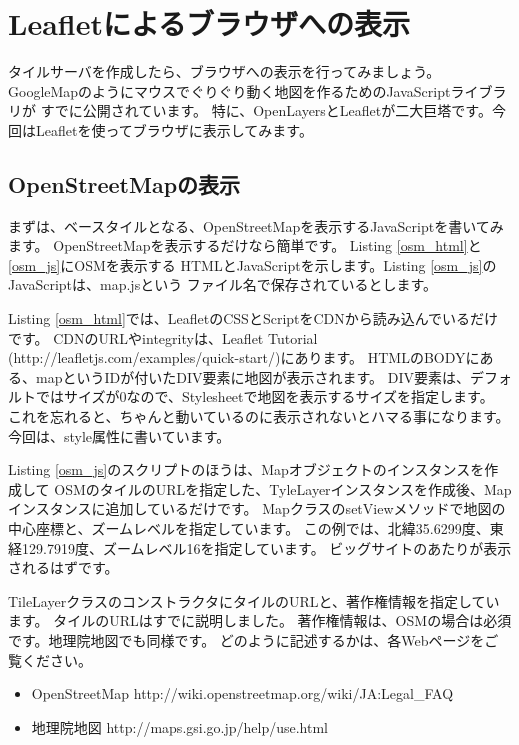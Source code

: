 \chapter*{Leafletによるブラウザへの表示}

タイルサーバを作成したら、ブラウザへの表示を行ってみましょう。
GoogleMapのようにマウスでぐりぐり動く地図を作るためのJavaScriptライブラリが
すでに公開されています。
特に、OpenLayersとLeafletが二大巨塔です。今回はLeafletを使ってブラウザに表示してみます。

\section*{OpenStreetMapの表示}

まずは、ベースタイルとなる、OpenStreetMapを表示するJavaScriptを書いてみます。
OpenStreetMapを表示するだけなら簡単です。
Listing \ref{osm_html}と\ref{osm_js}にOSMを表示する
HTMLとJavaScriptを示します。Listing \ref{osm_js}のJavaScriptは、map.jsという
ファイル名で保存されているとします。

Listing \ref{osm_html}では、LeafletのCSSとScriptをCDNから読み込んでいるだけです。
CDNのURLやintegrityは、Leaflet Tutorial (http://leafletjs.com/examples/quick-start/)にあります。
HTMLのBODYにある、mapというIDが付いたDIV要素に地図が表示されます。
DIV要素は、デフォルトではサイズが0なので、Stylesheetで地図を表示するサイズを指定します。
これを忘れると、ちゃんと動いているのに表示されないとハマる事になります。
今回は、style属性に書いています。



Listing \ref{osm_js}のスクリプトのほうは、Mapオブジェクトのインスタンスを作成して
OSMのタイルのURLを指定した、TyleLayerインスタンスを作成後、Mapインスタンスに追加しているだけです。
MapクラスのsetViewメソッドで地図の中心座標と、ズームレベルを指定しています。
この例では、北緯35.6299度、東経129.7919度、ズームレベル16を指定しています。
ビッグサイトのあたりが表示されるはずです。

TileLayerクラスのコンストラクタにタイルのURLと、著作権情報を指定しています。
タイルのURLはすでに説明しました。
著作権情報は、OSMの場合は必須です。地理院地図でも同様です。
どのように記述するかは、各Webページをご覧ください。
\begin{itemize}
\item OpenStreetMap http://wiki.openstreetmap.org/wiki/JA:Legal\_FAQ
  \item 地理院地図 http://maps.gsi.go.jp/help/use.html
\end{itemize}
      


